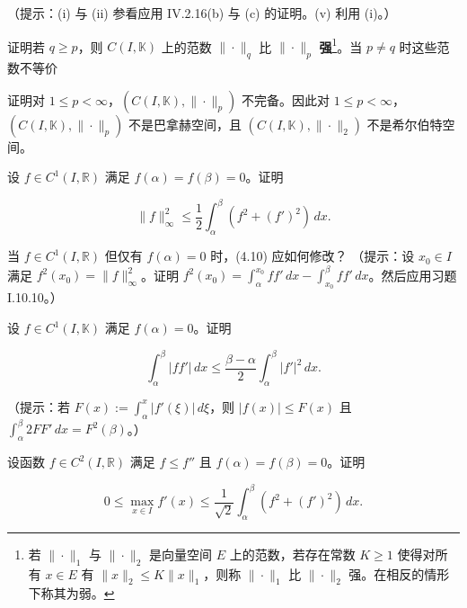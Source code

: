 \begin{exercises}
\begin{subitems}
（提示：(i) 与 (ii) 参看应用 IV.2.16(b) 与 (c) 的证明。(v) 利用 (i)。）

\end{subitems}

\item

证明若 $ q \ge p $，则 $ C(I, \mathbb{K}) $ 上的范数 $ \|\cdot\|_q $ 比 $ \|\cdot\|_p $ \textbf{强}\footnote{若 $ \|\cdot\|_1 $ 与 $ \|\cdot\|_2 $ 是向量空间 $ E $ 上的范数，若存在常数 $ K \ge 1 $ 使得对所有 $ x \in E $ 有 $ \|x\|_2 \le K \|x\|_1 $，则称 $ \|\cdot\|_1 $ 比 $ \|\cdot\|_2 $ 强。在相反的情形下称其为弱。}。当 $ p \ne q $ 时这些范数不等价

\item

证明对 $ 1 \le p < \infty $，$ (C(I, \mathbb{K}), \|\cdot\|_p) $ 不完备。因此对 $ 1 \le p < \infty $，$ (C(I, \mathbb{K}), \|\cdot\|_p) $ 不是巴拿赫空间，且 $ (C(I, \mathbb{K}), \|\cdot\|_2) $ 不是希尔伯特空间。

\item

设 $ f \in C^1(I, \mathbb{R}) $ 满足 $ f(\alpha) = f(\beta) = 0 $。证明

\begin{equation}
\|f\|_\infty^2 \le \frac{1}{2} \int_{\alpha}^{\beta} (f^2 + (f')^2) \, dx .\tag{4.10}
\end{equation}

当 $ f \in C^1(I, \mathbb{R}) $ 但仅有 $ f(\alpha) = 0 $ 时，(4.10) 应如何修改？
（提示：设 $ x_0 \in I $ 满足 $ f^2(x_0) = \|f\|_\infty^2 $。证明 $ f^2(x_0) = \int_{\alpha}^{x_0} f f' \, dx - \int_{x_0}^{\beta} f f' \, dx $。然后应用习题 I.10.10。）

\item

设 $ f \in C^1(I, \mathbb{K}) $ 满足 $ f(\alpha) = 0 $。证明

\[
\int_{\alpha}^{\beta} |f f'| \, dx \le \frac{\beta - \alpha}{2} \int_{\alpha}^{\beta} |f'|^2 \, dx .
\]

（提示：若 $ F(x) := \int_{\alpha}^{x} |f'(\xi)| \, d\xi $，则 $ |f(x)| \le F(x) $ 且 $ \int_{\alpha}^{\beta} 2 F F' \, dx = F^2(\beta) $。）

\item

设函数 $ f \in C^2(I, \mathbb{R}) $ 满足 $ f \le f'' $ 且 $ f(\alpha) = f(\beta) = 0 $。证明

\[
0 \le \max_{x \in I} f'(x) \le \frac{1}{\sqrt{2}} \int_{\alpha}^{\beta} (f^2 + (f')^2) \, dx .
\]


\end{exercises}
